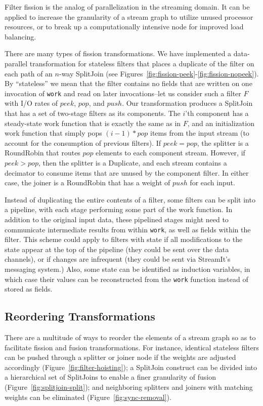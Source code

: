Filter fission is the analog of parallelization in the streaming
domain.  It can be applied to increase the granularity of a stream
graph to utilize unused processor resources, or to break up a
computationally intensive node for improved load balancing.  

There are many types of fission transformations.  We have implemented
a data-parallel transformation for stateless filters that places a
duplicate of the filter on each path of an $n$-way SplitJoin (see
Figures~\ref{fig:fission-peek}-\ref{fig:fission-nopeek}).  By
``stateless'' we mean that the filter contains no fields that are
written on one invocation of {\tt work} and read on later
invocations--let us consider such a filter $F$ with I/O rates of
$peek$, $pop$, and $push$.  Our transformation produces a SplitJoin
that has a set of two-stage filters as its components.  The $i$'th
component has a steady-state work function that is exactly the same as
in $F$, and an initialization work function that simply pops
$(i-1)*pop$ items from the input stream (to account for the
consumption of previous filters).  If $peek=pop$, the splitter is a
RoundRobin that routes $pop$ elements to each component stream.
However, if $peek>pop$, then the splitter is a Duplicate, and each
stream contains a decimator to consume items that are unused by the
component filter.  In either case, the joiner is a RoundRobin that has
a weight of $push$ for each input.

Instead of duplicating the entire contents of a filter, some filters
can be split into a pipeline, with each stage performing some part of
the work function.  In addition to the original input data, these
pipelined stages might need to communicate intermediate results from
within {\tt work}, as well as fields within the filter.  This scheme
could apply to filters with state if all modifications to the state
appear at the top of the pipeline (they could be sent over the data
channels), or if changes are infrequent (they could be sent via
StreamIt's messaging system.)  Also, some state can be identified as
induction variables, in which case their values can be reconstructed
from the {\tt work} function instead of stored as fields.

\subsection{Reordering Transformations}

There are a multitude of ways to reorder the elements of a stream
graph so as to facilitate fission and fusion transformations.  For
instance, identical stateless filters can be pushed through a splitter
or joiner node if the weights are adjusted accordingly
(Figure~\ref{fig:filter-hoisting}); a SplitJoin construct can be
divided into a hierarchical set of SplitJoins to enable a finer
granularity of fusion (Figure~\ref{fig:splitjoin-split}); and
neighboring splitters and joiners with matching weights can be
eliminated (Figure~\ref{fig:sync-removal}).

